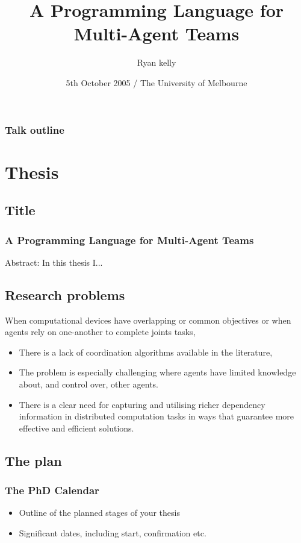 \documentclass[compress]{beamer}
\title
{A Programming Language for Multi-Agent Teams}
\author
{Ryan kelly}
\institute[University of Melbourne]
{
  Department of Computer Science and Software Engineering\\
  University of Melbourne%
}
\date[The University of Melbourne]
{5th October 2005 / The University of Melbourne}
\begin{document}
\begin{frame}
  \titlepage
\end{frame}

\begin{frame}
  \frametitle{Talk outline}
  \tableofcontents
\end{frame}

\section{Thesis}

\subsection{Title}

\begin{frame}
\frametitle{A Programming Language for Multi-Agent Teams}
Abstract: In this thesis I...
\end{frame}

\subsection{Research problems}

\begin{frame}
When computational devices have overlapping or common objectives or when agents rely on one-another to complete joints tasks,
\begin{itemize}
\item<2> There is a lack of coordination algorithms available in the literature,
\item<3> The problem is especially challenging where agents have limited knowledge about, and control over, other agents.  
\item<4> There is a clear need for capturing and utilising richer dependency information in distributed computation tasks in ways that guarantee more effective and efficient solutions.
\end{itemize}
\end{frame}

\subsection{The plan}

\begin{frame}
\frametitle{The PhD Calendar}
\begin{itemize}
\item<1> Outline of the planned stages of your thesis
\item<2> Significant dates, including start, confirmation etc.
\end{itemize}
\end{frame}
\end{document}
